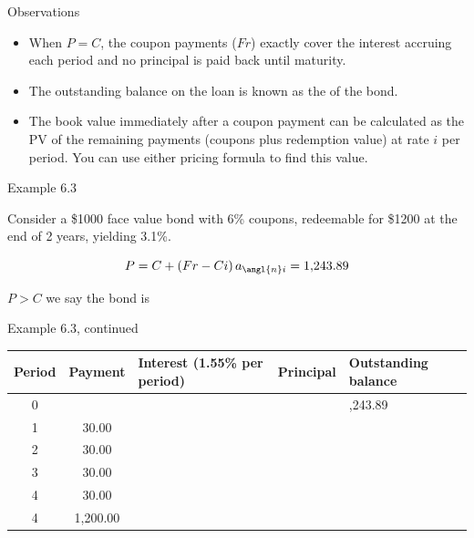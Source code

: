 \documentclass{beamer}
\begin{document}
\begin{frame}{Observations}

\begin{itemize}
\item When $P = C$, the coupon payments ($Fr$) exactly cover the interest accruing each period and no principal is paid back until maturity.
\item The outstanding balance on the loan is known as the  of the bond.
\item The book value immediately after a coupon payment can be calculated as the PV of the remaining payments (coupons plus redemption value) at rate $i$ per period. You can use either pricing formula to find this value.
\end{itemize}

\end{frame}

\begin{frame}{Example 6.3}

Consider a \$1000 face value bond with 6\% coupons, redeemable for \$1200 at the end of 2 years, yielding 3.1\%.

\begin{center}
\end{center}

\[
P = C + (Fr - Ci)\,a_{\angl{n}i} = 1{,}243.89
\]

$P > C$ we say the bond is 

\end{frame}

\begin{frame}{Example 6.3, continued}

\begin{center}
\renewcommand{\arraystretch}{1.35}
\small
\begin{tabular}{cc>{\centering\arraybackslash}p{}c>{\centering\arraybackslash}p{}}
\toprule
\textbf{Period} & \textbf{Payment} & \textbf{Interest (1.55\% per period)} & \textbf{Principal} & \textbf{Outstanding balance} \\
\midrule
0 & & & & 1,243.89 \\
1 & 30.00 & & & \\
2 & 30.00 & & & \\
3 & 30.00 & & & \\
4 & 30.00 & & & \\
4 & 1,200.00 & & & \\
\bottomrule
\end{tabular}
\end{center}

\end{frame}
\end{document}
